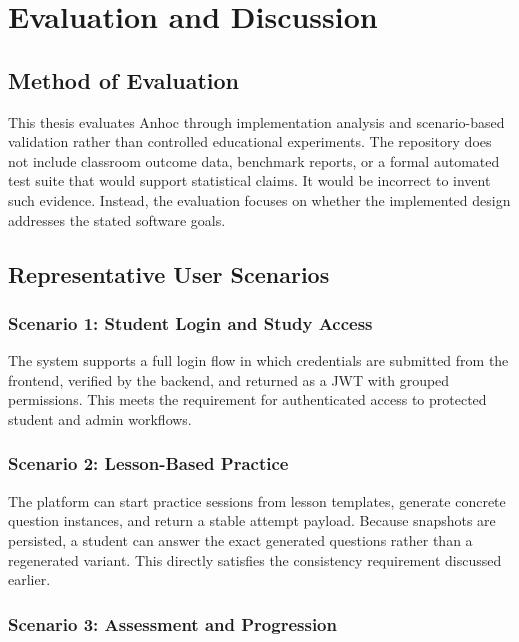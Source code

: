 \chapter{Evaluation and Discussion}

\section{Method of Evaluation}

This thesis evaluates Anhoc through implementation analysis and scenario-based validation rather than controlled educational experiments. The repository does not include classroom outcome data, benchmark reports, or a formal automated test suite that would support statistical claims. It would be incorrect to invent such evidence. Instead, the evaluation focuses on whether the implemented design addresses the stated software goals.

\section{Representative User Scenarios}

\subsection*{Scenario 1: Student Login and Study Access}

The system supports a full login flow in which credentials are submitted from the frontend, verified by the backend, and returned as a JWT with grouped permissions. This meets the requirement for authenticated access to protected student and admin workflows.

\subsection*{Scenario 2: Lesson-Based Practice}

The platform can start practice sessions from lesson templates, generate concrete question instances, and return a stable attempt payload. Because snapshots are persisted, a student can answer the exact generated questions rather than a regenerated variant. This directly satisfies the consistency requirement discussed earlier.

\subsection*{Scenario 3: Assessment and Progression}

